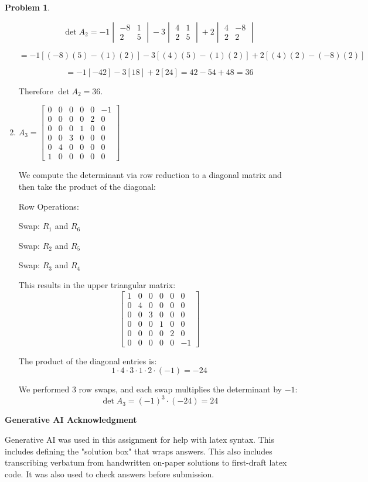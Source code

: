 \documentclass[12pt, oneside]{amsart}
\theoremstyle{definition}
\newtheorem{prob}{Problem}
\begin{document}
\begin{prob}
\begin{enumerate}
\begin{solution}
    \[
    \det A_2 = -1 \begin{vmatrix} -8 & 1 \\ 2 & 5 \end{vmatrix} - 3 \begin{vmatrix} 4 & 1 \\ 2 & 5 \end{vmatrix} + 2 \begin{vmatrix} 4 & -8 \\ 2 & 2 \end{vmatrix}
    \]
    
    \[
    = -1[(-8)(5) - (1)(2)] - 3[(4)(5) - (1)(2)] + 2[(4)(2) - (-8)(2)]
    \]
    
    \[
    = -1[-42] - 3[18] + 2[24] = 42 - 54 + 48 = 36
    \]
    
    Therefore $\det A_2 = 36$.
    \end{solution}

    \item $A_3= \left[\begin{matrix}
        0 & 0 & 0 & 0 & 0 & -1 \\
        0 & 0 & 0 & 0 & 2 & 0 \\ 
        0 & 0 & 0 & 1 & 0 & 0 \\
        0 & 0 & 3 & 0 & 0 & 0 \\
        0 & 4 & 0 & 0 & 0 & 0 \\
        1 & 0 & 0 & 0 & 0 & 0 
    \end{matrix}\right]$
    
    \begin{solution}
    We compute the determinant via row reduction to a diagonal matrix and then take the product of the diagonal:
    
    Row Operations:
    
    Swap: $R_1$ and $R_6$

    Swap: $R_2$ and $R_5$

    Swap: $R_3$ and $R_4$

    This results in the upper triangular matrix:
    \[
    \begin{bmatrix}
    1 & 0 & 0 & 0 & 0 & 0 \\
    0 & 4 & 0 & 0 & 0 & 0 \\
    0 & 0 & 3 & 0 & 0 & 0 \\
    0 & 0 & 0 & 1 & 0 & 0 \\
    0 & 0 & 0 & 0 & 2 & 0 \\
    0 & 0 & 0 & 0 & 0 & -1
    \end{bmatrix}
    \]
    
    The product of the diagonal entries is:
    \[
    1 \cdot 4 \cdot 3 \cdot 1 \cdot 2 \cdot (-1) = -24
    \]
    
    We performed 3 row swaps, and each swap multiplies the determinant by $-1$:
    \[
    \det A_3 = (-1)^3 \cdot (-24) = 24
    \]
    \end{solution}
\end{enumerate}
\end{prob}
\noindent \textbf{Generative AI Acknowledgment}

\noindent Generative AI was used in this assignment for help with latex syntax. This includes defining the "solution box" that wraps answers. This also includes transcribing verbatum from handwritten on-paper solutions to first-draft latex code.
It was also used to check answers before submission.
\end{document}
